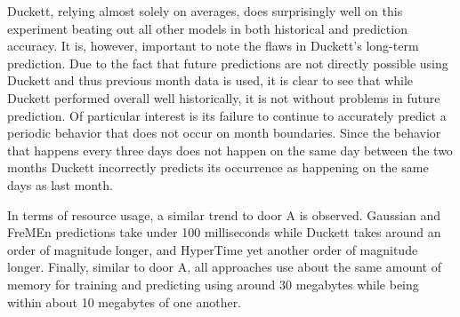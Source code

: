 Duckett, relying almost solely on averages, does surprisingly well on this
experiment beating out all other models in both historical and prediction
accuracy.  It is, however, important to note the flaws in Duckett's long-term
prediction. Due to the fact that future predictions are not directly possible
using Duckett and thus previous month data is used, it is clear to see that
while Duckett performed overall well historically, it is not without problems
in future prediction.  Of particular interest is its failure to continue to
accurately predict a periodic behavior that does not occur on month
boundaries. Since the behavior that happens every three days does not happen
on the same day between the two months Duckett incorrectly predicts its
occurrence as happening on the same days as last month.

In terms of resource usage, a similar trend to door A is observed. Gaussian
and FreMEn predictions take under 100 milliseconds while Duckett takes around
an order of magnitude longer, and HyperTime yet another order of magnitude
longer. Finally, similar to door A, all approaches use about the same amount
of memory for training and predicting using around 30 megabytes while being
within about 10 megabytes of one another.

